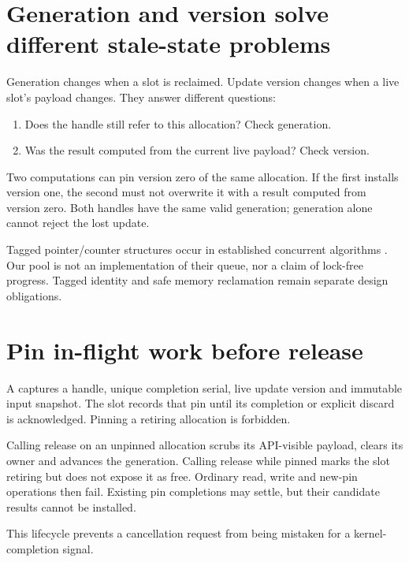 \section{Generation and version solve different stale-state problems}
Generation changes when a slot is reclaimed. Update version changes when a
live slot's payload changes. They answer different questions:
\begin{enumerate}
\item Does the handle still refer to this allocation? Check generation.
\item Was the result computed from the current live payload? Check version.
\end{enumerate}

Two computations can pin version zero of the same allocation. If the first
installs version one, the second must not overwrite it with a result computed
from version zero. Both handles have the same valid generation; generation
alone cannot reject the lost update.

Tagged pointer/counter structures occur in established concurrent algorithms
\cite{evo32-michael}. Our pool is not an implementation of their queue, nor a
claim of lock-free progress. Tagged identity and safe memory reclamation remain
separate design obligations.

\section{Pin in-flight work before release}
A  captures a handle, unique completion serial, live update
version and immutable input snapshot. The slot records that pin until its
completion or explicit discard is acknowledged. Pinning a retiring allocation
is forbidden.

Calling release on an unpinned allocation scrubs its API-visible payload,
clears its owner and advances the generation. Calling release while pinned
marks the slot retiring but does not expose it as free. Ordinary read, write
and new-pin operations then fail. Existing pin completions may settle, but
their candidate results cannot be installed.

This lifecycle prevents a cancellation request from being mistaken for a
kernel-completion signal.

